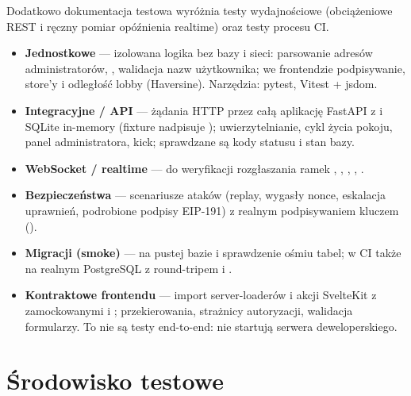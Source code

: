 Dodatkowo dokumentacja testowa wyróżnia testy wydajnościowe (obciążeniowe REST i
ręczny pomiar opóźnienia realtime) oraz testy procesu CI.

\begin{itemize}
  \item \textbf{Jednostkowe} --- izolowana logika bez bazy i sieci: parsowanie adresów administratorów, , walidacja nazw użytkownika; we frontendzie podpisywanie, store'y i odległość lobby (Haversine). Narzędzia: pytest, Vitest + jsdom.
  \item \textbf{Integracyjne / API} --- żądania HTTP przez całą aplikację FastAPI z  i SQLite in-memory (fixture nadpisuje ); uwierzytelnianie, cykl życia pokoju, panel administratora, kick; sprawdzane są kody statusu i stan bazy.
  \item \textbf{WebSocket / realtime} ---  do weryfikacji rozgłaszania ramek , , , , .
  \item \textbf{Bezpieczeństwa} --- scenariusze ataków (replay, wygasły nonce, eskalacja uprawnień, podrobione podpisy EIP-191) z realnym podpisywaniem kluczem ().
  \item \textbf{Migracji (smoke)} ---  na pustej bazie i sprawdzenie ośmiu tabel; w CI także na realnym PostgreSQL z round-tripem i .
  \item \textbf{Kontraktowe frontendu} --- import server-loaderów i akcji SvelteKit z zamockowanymi  i ; przekierowania, strażnicy autoryzacji, walidacja formularzy. To nie są testy end-to-end: nie startują serwera deweloperskiego.
\end{itemize}

\section{Środowisko testowe}
\label{sec:op-srodowisko-testow}

